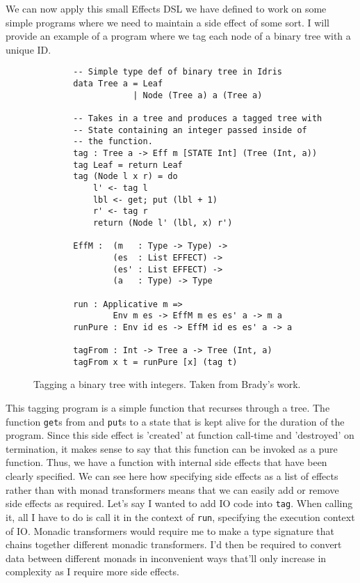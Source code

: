 We can now apply this small Effects DSL we have defined to work on some simple
programs where we need to maintain a side effect of some sort. I will provide an
example of a program where we tag each node of a binary tree with a unique ID. 

\begin{figure}[ht!!!!]
    \caption{Tagging a binary tree with integers. Taken from Brady's work.
    \protect\cite{algebraic}}
    \label{tag_def}
    \begin{lstlisting}
        -- Simple type def of binary tree in Idris
        data Tree a = Leaf
                    | Node (Tree a) a (Tree a)
        
        -- Takes in a tree and produces a tagged tree with
        -- State containing an integer passed inside of
        -- the function. 
        tag : Tree a -> Eff m [STATE Int] (Tree (Int, a))
        tag Leaf = return Leaf
        tag (Node l x r) = do
            l' <- tag l
            lbl <- get; put (lbl + 1)
            r' <- tag r
            return (Node l' (lbl, x) r')
        
        EffM :  (m   : Type -> Type) ->
                (es  : List EFFECT) ->
                (es' : List EFFECT) ->
                (a   : Type) -> Type
        
        run : Applicative m => 
                Env m es -> EffM m es es' a -> m a
        runPure : Env id es -> EffM id es es' a -> a

        tagFrom : Int -> Tree a -> Tree (Int, a)
        tagFrom x t = runPure [x] (tag t)
    \end{lstlisting}
\end{figure}

This tagging program is a simple function that recurses through a tree. The
function \texttt{get}s from and \texttt{put}s to a state that is kept alive for
the duration of the program. Since this side effect is 'created' at function
call-time and 'destroyed' on termination, it makes sense to say that this
function can be invoked as a pure function. Thus, we have a function with
internal side effects that have been clearly specified. We can see here how
specifying side effects as a list of effects rather than with monad transformers
means that we can easily add or remove side effects as required. Let's say I
wanted to add IO code into \texttt{tag}. When calling it, all I have to do is
call it in the context of \texttt{run}, specifying the execution context of IO.
Monadic transformers would require me to make a type signature that chains
together different monadic transformers. I'd then be required to convert data
between different monads in inconvenient ways that'll only increase in
complexity as I require more side effects.

